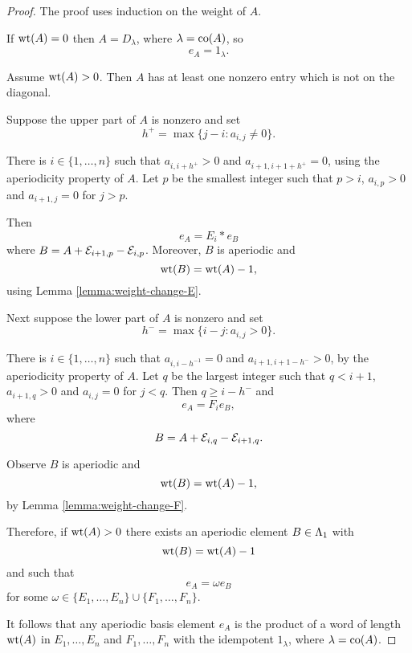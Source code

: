 \documentclass[a4paper, 11pt]{report}
\begin{document}
\begin{proof}
The proof uses induction on the weight of $A$.

If $\operatorname{wt}(A)=0$ then $A=D_\lambda$, where $\lambda=\operatorname{co}(A)$, so
\begin{equation*}
e_A = 1_\lambda.
\end{equation*}

Assume $\operatorname{wt}(A)>0$. Then $A$ has at least one nonzero entry which is not on the diagonal.

Suppose the upper part of $A$ is nonzero and set
\begin{equation*}
h^+ = \max\{j-i:a_{i,j}\neq 0\}.
\end{equation*}

There is $i\in\{1,\ldots,n\}$ such that $a_{i,i+h^{+}}>0$ and $a_{i+1,i+1+h^{+}}=0$, using the aperiodicity property of $A$. Let $p$ be the smallest integer such that $p>i$, $a_{i,p}>0$ and $a_{i+1,j}=0$ for $j>p$.

Then
\begin{equation*}
e_A = E_i\ast e_B
\end{equation*}
where $B=A+\mathcal{E}_{i+1,p} -\mathcal{E}_{i,p}$. Moreover, $B$ is aperiodic and
\begin{equation*}
\operatorname{wt}(B) = \operatorname{wt}(A)-1,
\end{equation*}
using Lemma \ref{lemma:weight-change-E}.

Next suppose the lower part of $A$ is nonzero and set
\begin{equation*}
h^- = \max\{i-j:a_{i,j}>0\}.
\end{equation*}

There is $i\in\{1,\ldots,n\}$ such that $a_{i,i-h^{-1}}=0$ and $a_{i+1,i+1-h^{-}}>0$, by the aperiodicity property of $A$. Let $q$ be the largest integer such that $q<i+1$, $a_{i+1,q}>0$ and $a_{i,j}=0$ for $j<q$. Then $q\geq i-h^{-}$ and
\begin{equation*}
e_A = F_i e_B,
\end{equation*}
where
\begin{equation*}
B = A + \mathcal{E}_{i,q} - \mathcal{E}_{i+1,q}.
\end{equation*}

Observe $B$ is aperiodic and
\begin{equation*}
\operatorname{wt}(B) = \operatorname{wt}(A)-1,
\end{equation*}
by Lemma \ref{lemma:weight-change-F}.

Therefore, if $\operatorname{wt}(A)>0$ there exists an aperiodic element $B\in\Lambda_1{}$ with
\begin{equation*}
\operatorname{wt}(B) = \operatorname{wt}(A) - 1
\end{equation*}
and such that
\begin{equation*}
e_A = \omega e_B
\end{equation*}
for some $\omega\in\{E_1,\ldots,E_n\}\cup\{F_1,\ldots,F_n\}$.

It follows that any aperiodic basis element $e_A$ is the product of a word of length $\operatorname{wt}(A)$ in $E_1,\ldots,E_n$ and $F_1,\ldots,F_n$ with the idempotent $1_\lambda$, where $\lambda=\operatorname{co}(A)$.
\end{proof}
\end{document}
